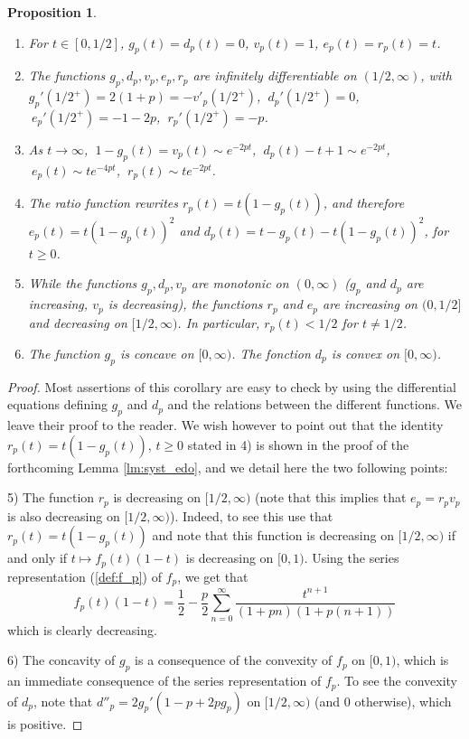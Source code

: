 \documentclass[a4, 11pt]{article}
\numberwithin{equation}{section}
\theoremstyle{plain}
\newtheorem{proposition}[theorem]{Proposition}
\theoremstyle{definition}
\theoremstyle{remark}
\begin{document}
\begin{proposition}
\label{prop:propfunctions}
\begin{enumerate}
\item[\emph{1)}] For $t \in [0,1/2]$, $g_p(t)=d_p(t)=0$, $v_p(t)=1$, $e_p(t)=r_p(t)=t$.
\item[\emph{2)}] The functions $g_p,d_p,v_p,e_p,r_p$ are infinitely differentiable on $(1/2,\infty)$, with \linebreak $g_p'(1/2^+)=2(1+p)=-v'_p(1/2^+)$,  $~  d_p'(1/2^+)=0$, $~  e_p'(1/2^+)=-1-2p$, $~  r_p'(1/2^+)=-p$.  
\item[\emph{3)}] As $t \rightarrow \infty$,  $~ 1-g_p(t)=v_p(t) \sim e^{-2pt}$, $~ d_p(t)-t+1 \sim e^{-2pt}$, $~ e_p(t) \sim te^{-4pt}$, $~ r_p(t)  \sim te^{-2pt}$.
\item[\emph{4)}] The ratio function rewrites $r_p(t)=t(1-g_p(t))$, and therefore $e_p(t)=t(1-g_p(t))^2$ and \newline $d_p(t)=t-g_p(t)-t(1-g_p(t))^2$, for $t\geq 0$.
\item[\emph{5)}] While the functions $g_p,d_p,v_p$ are monotonic on $(0,\infty)$ ($g_p$ and $d_p$ are increasing, $v_p$ is decreasing), the functions $r_p$ and $e_p$ are increasing on $(0,1/2]$ and decreasing on $[1/2,\infty)$. In particular, $r_p(t)<1/2$ for $t\neq 1/2$.
\item[\emph{6)}] The function $g_p$ is concave on $[0,\infty)$. The fonction $d_p$ is convex on $[0,\infty)$.
\end{enumerate}
\end{proposition}

\begin{proof} Most assertions of this corollary are easy to check by using the differential equations defining $g_p$ and $d_p$ and the relations between the different functions. We leave their proof to the reader. We wish however to point out that the identity $r_p(t)=t(1-g_p(t))$, $t\geq 0$ stated in 4) is shown in the proof of the forthcoming Lemma \ref{lm:syst_edo}, and we detail here the two following points: 

5) The function $r_p$ is decreasing on $[1/2,\infty)$ (note that this implies that $e_p=r_pv_p$ is also decreasing on $[1/2,\infty)$). Indeed, to see this use that $r_p(t)=t(1-g_p(t))$ and note that this function is decreasing on $[1/2,\infty)$ if and only if $t\mapsto f_p(t)(1-t)$ is decreasing on $[0,1)$. Using the series representation (\ref{def:f_p}) of $f_p$, we get that
$$
f_p(t)(1-t)=\frac{1}{2}-\frac{p}{2}  \sum_{n=0}^{\infty} \frac{t^{n+1}}{(1+pn)(1+p(n+1))}
$$
which is clearly decreasing. 

6) The concavity of $g_p$ is a consequence of the convexity of $f_p$ on $[0,1)$, which is an immediate consequence of the series representation of $f_p$. To see the convexity of $d_p$, note that \linebreak $d''_p=2g_p'(1-p+2pg_p)$ on $[1/2,\infty)$ (and 0 otherwise), which is positive.
\end{proof}
\end{document}
